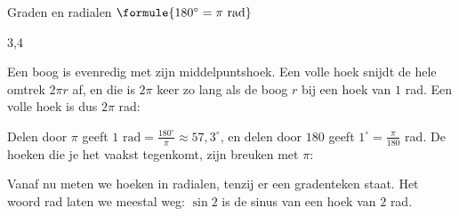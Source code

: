 \begin{theorie}
\begin{stelling}{Graden en radialen}
\qquad $\formule{180^\circ = \pi \text{ rad}}$
\end{stelling}
\begin{alleenvoor}{3,4}
\begin{bewijs}
Een boog is evenredig met zijn middelpuntshoek. Een volle hoek snijdt de hele omtrek $2\pi r$ af, en die is $2\pi$ keer zo lang als de boog $r$ bij een hoek van $1$ rad. Een volle hoek is dus $2\pi$ rad:
\end{bewijs}
\end{alleenvoor}
\end{theorie}

Delen door $\pi$ geeft $1 \text{ rad} = \frac{180^\circ}{\pi} \approx 57{,}3^\circ$, en delen door $180$ geeft $1^\circ = \frac{\pi}{180}$ rad. De hoeken die je het vaakst tegenkomt, zijn breuken met $\pi$:


Vanaf nu meten we hoeken in radialen, tenzij er een gradenteken staat. Het woord rad laten we meestal weg: $\sin 2$ is de sinus van een hoek van $2$ rad.


